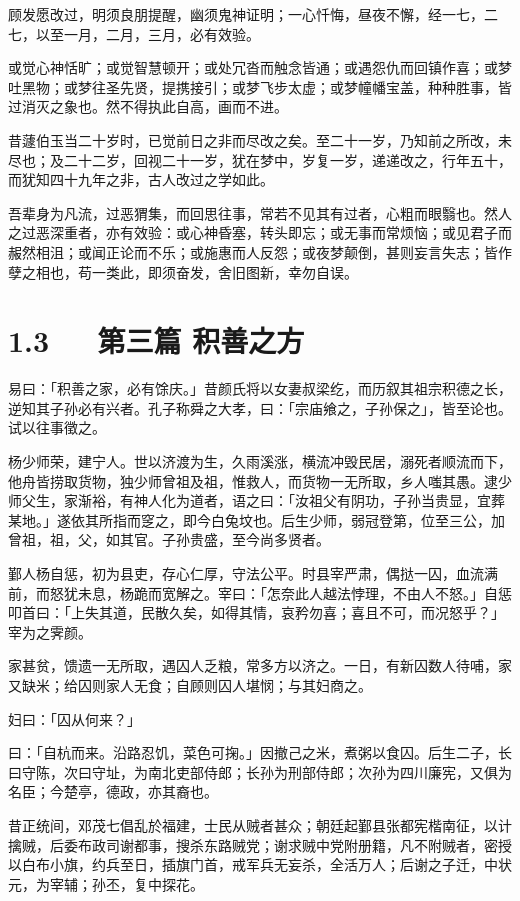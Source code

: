 \documentclass[letterpaper,12pt,english]{sphinxmanual}
\begin{document}
顾发愿改过，明须良朋提醒，幽须鬼神证明；一心忏悔，昼夜不懈，经一七，二七，以至一月，二月，三月，必有效验。

或觉心神恬旷；或觉智慧顿开；或处冗沓而触念皆通；或遇怨仇而回镇作喜；或梦吐黑物；或梦往圣先贤，提携接引；或梦飞步太虚；或梦幢幡宝盖，种种胜事，皆过消灭之象也。然不得执此自高，画而不进。

昔蘧伯玉当二十岁时，已觉前日之非而尽改之矣。至二十一岁，乃知前之所改，未尽也；及二十二岁，回视二十一岁，犹在梦中，岁复一岁，递递改之，行年五十，而犹知四十九年之非，古人改过之学如此。

吾辈身为凡流，过恶猬集，而回思往事，常若不见其有过者，心粗而眼翳也。然人之过恶深重者，亦有效验：或心神昏塞，转头即忘；或无事而常烦恼；或见君子而赧然相沮；或闻正论而不乐；或施惠而人反怨；或夜梦颠倒，甚则妄言失志；皆作孽之相也，苟一类此，即须奋发，舍旧图新，幸勿自误。


\section{1.3   第三篇 积善之方}
\label{\detokenize{p00_u5176_u5b83/_u8881_u4e86_u51e1-_u4e86_u51e1_u56db_u8bad:id5}}
易曰：「积善之家，必有馀庆。」昔颜氏将以女妻叔梁纥，而历叙其祖宗积德之长，逆知其子孙必有兴者。孔子称舜之大孝，曰：「宗庙飨之，子孙保之」，皆至论也。试以往事徵之。

杨少师荣，建宁人。世以济渡为生，久雨溪涨，横流冲毁民居，溺死者顺流而下，他舟皆捞取货物，独少师曾祖及祖，惟救人，而货物一无所取，乡人嗤其愚。逮少师父生，家渐裕，有神人化为道者，语之曰：「汝祖父有阴功，子孙当贵显，宜葬某地。」遂依其所指而窆之，即今白兔坟也。后生少师，弱冠登第，位至三公，加曾祖，祖，父，如其官。子孙贵盛，至今尚多贤者。

鄞人杨自惩，初为县吏，存心仁厚，守法公平。时县宰严肃，偶挞一囚，血流满前，而怒犹未息，杨跪而宽解之。宰曰：「怎奈此人越法悖理，不由人不怒。」自惩叩首曰：「上失其道，民散久矣，如得其情，哀矜勿喜；喜且不可，而况怒乎？」宰为之霁颜。

家甚贫，馈遗一无所取，遇囚人乏粮，常多方以济之。一日，有新囚数人待哺，家又缺米；给囚则家人无食；自顾则囚人堪悯；与其妇商之。

妇曰：「囚从何来？」

曰：「自杭而来。沿路忍饥，菜色可掬。」因撤己之米，煮粥以食囚。后生二子，长曰守陈，次曰守址，为南北吏部侍郎；长孙为刑部侍郎；次孙为四川廉宪，又俱为名臣；今楚亭，德政，亦其裔也。

昔正统间，邓茂七倡乱於福建，士民从贼者甚众；朝廷起鄞县张都宪楷南征，以计擒贼，后委布政司谢都事，搜杀东路贼党；谢求贼中党附册籍，凡不附贼者，密授以白布小旗，约兵至日，插旗门首，戒军兵无妄杀，全活万人；后谢之子迁，中状元，为宰辅；孙丕，复中探花。
\end{document}

